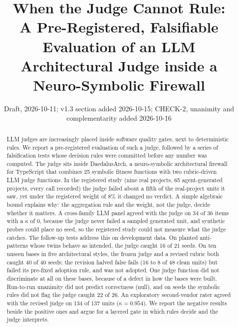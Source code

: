 \documentclass[10pt,a4paper]{article}
\title{When the Judge Cannot Rule:\\A Pre-Registered, Falsifiable Evaluation of an LLM Architectural Judge inside a Neuro-Symbolic Firewall}
\author{\todo{author list and affiliations}}
\date{Draft, 2026-10-11; v1.3 section added 2026-10-15; CHECK-2, unanimity and complementarity added 2026-10-16}
\newcommand{\tool}{DaedalusArch}
\begin{document}
\maketitle

\begin{abstract}
LLM judges are increasingly placed inside software quality gates, next to deterministic rules. We report a
pre-registered evaluation of such a judge, followed by a series of falsification tests whose decision rules were
committed before any number was computed. The judge sits inside \tool{}, a neuro-symbolic architectural firewall for
TypeScript that combines 25 symbolic fitness functions with two rubric-driven LLM judge functions. In the registered
study (nine real projects, 65 agent-generated projects, every call recorded) the judge failed about a fifth of the
real-project units it saw, yet under the registered weight of 8\% it changed no verdict. A simple algebraic bound
explains why: the aggregation rule and the weight, not the judge, decide whether it matters. A cross-family LLM panel
agreed with the judge on 34 of 36 items with a $\kappa$ of 0, because the judge never failed a sampled generated
unit, and synthetic probes could place no seed, so the registered study could not measure what the judge catches.
The follow-up tests address this on development data. On planted anti-patterns whose twins behave as intended, the
judge caught 16 of 21 seeds. On ten unseen bases in five architectural styles, the frozen judge and a revised rubric
both caught 40 of 40 seeds; the revision halved false fails (16 to 8 of 48 clean units) but failed its pre-fixed
adoption rule, and was not adopted. One judge function did not discriminate at all on these bases, because of a
defect in how the bases were built. Run-to-run unanimity did not predict correctness (null), and on seeds the
symbolic rules did not flag the judge caught 22 of 26. An exploratory second-vendor rater agreed with the revised
judge on 134 of 137 units ($\kappa = 0.954$). We report the negative results beside the positive ones and argue for a
layered gate in which rules decide and the judge interprets.
\end{abstract}
\end{document}

